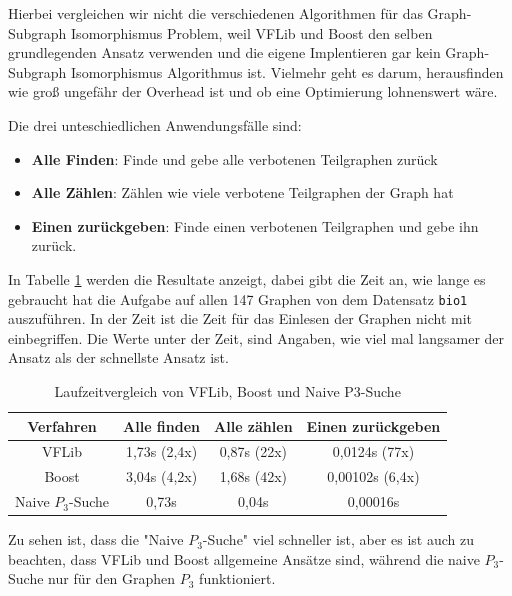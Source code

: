 \documentclass[12pt,a4paper,onecolumn,oneside,titlepage]{article}
\newcommand{\vars}{\texttt}
\begin{document}
Hierbei vergleichen wir nicht die verschiedenen Algorithmen für das Graph-Subgraph Isomorphismus Problem, weil VFLib und Boost den selben grundlegenden Ansatz verwenden und die eigene Implentieren gar kein Graph-Subgraph Isomorphismus Algorithmus ist. Vielmehr geht es darum, herausfinden wie groß ungefähr der Overhead ist und ob eine Optimierung lohnenswert wäre.

Die drei unteschiedlichen Anwendungsfälle sind:
\begin{itemize}
 \item \textbf{Alle Finden}: Finde und gebe alle verbotenen Teilgraphen zurück
 \item \textbf{Alle Zählen}: Zählen wie viele verbotene Teilgraphen der Graph hat
 \item \textbf{Einen zurückgeben}: Finde einen verbotenen Teilgraphen und gebe ihn zurück.
\end{itemize}

In Tabelle \ref{tab:benchmark_isomorph} werden die Resultate anzeigt, dabei gibt die Zeit an, wie lange es gebraucht hat die Aufgabe auf allen 147 Graphen von dem Datensatz \vars{bio1} auszuführen. In der Zeit ist die Zeit für das Einlesen der Graphen nicht mit einbegriffen. Die Werte unter der Zeit, sind Angaben, wie viel mal langsamer der Ansatz als der schnellste Ansatz ist.
\begin{table}

\centering

\begin{tabular}{c ccc}
\hline 
Verfahren & Alle finden & Alle zählen & Einen zurückgeben \\ 
\hline 
VFLib & 1,73s (2,4x) & 0,87s (22x) & 0,0124s (77x) \\ 
Boost & 3,04s (4,2x) & 1,68s (42x) & 0,00102s (6,4x) \\ 
Naive $P_3$-Suche & 0,73s & 0,04s & 0,00016s \\ 
\hline 
\end{tabular} 
\caption{Laufzeitvergleich von VFLib, Boost und Naive P3-Suche}
\label{tab:benchmark_isomorph}
\end{table}
Zu sehen ist, dass die "Naive $P_3$-Suche" viel schneller ist, aber es ist auch zu beachten, dass VFLib und Boost allgemeine Ansätze sind, während die naive $P_3$-Suche nur für den Graphen $P_3$ funktioniert. 
\end{document}

